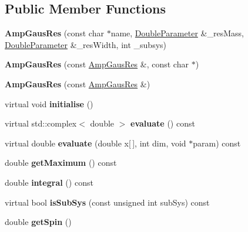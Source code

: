 \subsection*{Public Member Functions}
\begin{DoxyCompactItemize}
\item 
\hypertarget{class_amp_gaus_res_a6557a4dd37a02f200a7fb05f182a92c1}{{\bfseries Amp\-Gaus\-Res} (const char $\ast$name, \hyperlink{class_double_parameter}{Double\-Parameter} \&\-\_\-res\-Mass, \hyperlink{class_double_parameter}{Double\-Parameter} \&\-\_\-res\-Width, int \-\_\-subsys)}\label{class_amp_gaus_res_a6557a4dd37a02f200a7fb05f182a92c1}

\item 
\hypertarget{class_amp_gaus_res_a29f81df3b1221bb8f51bb7f2e6b30bb0}{{\bfseries Amp\-Gaus\-Res} (const \hyperlink{class_amp_gaus_res}{Amp\-Gaus\-Res} \&, const char $\ast$)}\label{class_amp_gaus_res_a29f81df3b1221bb8f51bb7f2e6b30bb0}

\item 
\hypertarget{class_amp_gaus_res_a4cd1e8c23f1bb6917729ec185133a78e}{{\bfseries Amp\-Gaus\-Res} (const \hyperlink{class_amp_gaus_res}{Amp\-Gaus\-Res} \&)}\label{class_amp_gaus_res_a4cd1e8c23f1bb6917729ec185133a78e}

\item 
\hypertarget{class_amp_gaus_res_a8a8b898346b9a8a3e277a7cd3618cdee}{virtual void {\bfseries initialise} ()}\label{class_amp_gaus_res_a8a8b898346b9a8a3e277a7cd3618cdee}

\item 
\hypertarget{class_amp_gaus_res_a92183914f8fa048073f6599a56ce0cd3}{virtual std\-::complex$<$ double $>$ {\bfseries evaluate} () const }\label{class_amp_gaus_res_a92183914f8fa048073f6599a56ce0cd3}

\item 
\hypertarget{class_amp_gaus_res_aef07a6176d609572a564f37f187d24df}{virtual double {\bfseries evaluate} (double x\mbox{[}$\,$\mbox{]}, int dim, void $\ast$param) const }\label{class_amp_gaus_res_aef07a6176d609572a564f37f187d24df}

\item 
\hypertarget{class_amp_gaus_res_a328003b9ffff46daf55f747fdeb8a92d}{double {\bfseries get\-Maximum} () const }\label{class_amp_gaus_res_a328003b9ffff46daf55f747fdeb8a92d}

\item 
\hypertarget{class_amp_gaus_res_ae578a7d89933f434906dcfce7c259d60}{double {\bfseries integral} () const }\label{class_amp_gaus_res_ae578a7d89933f434906dcfce7c259d60}

\item 
\hypertarget{class_amp_gaus_res_acd7ec796cdb1c9c19a7ec3ddd0a0b68a}{virtual bool {\bfseries is\-Sub\-Sys} (const unsigned int sub\-Sys) const }\label{class_amp_gaus_res_acd7ec796cdb1c9c19a7ec3ddd0a0b68a}

\item 
\hypertarget{class_amp_gaus_res_a092845696d6be8b5b6dd78b9d5bf5fc8}{double {\bfseries get\-Spin} ()}\label{class_amp_gaus_res_a092845696d6be8b5b6dd78b9d5bf5fc8}

\end{DoxyCompactItemize}
